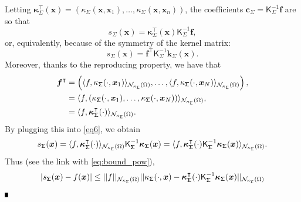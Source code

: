 \documentclass[hyphens,a4paper,11pt]{article}
\newcommand{\bs}{\boldsymbol}
\def\blackbox{\leavevmode\vrule height 5pt width 4pt depth 0pt\relax}
\newenvironment{proof}{\begin{trivlist}
\item[]\hspace{0cm}{\bf Proof:}
\hspace{0cm} }{\hfill $\blackbox$
\end{trivlist}}
\newcommand{\mK}{\mathsf{K}}
\newcommand{\mSigma}{\mathsf{\Sigma}}
\begin{document}
\begin{proof}
    Letting $\boldsymbol{\kappa}_{\mSigma}^{\intercal}({\boldsymbol{x}} ) = \left(\kappa_{\mSigma}(\boldsymbol{x},\boldsymbol{x}_1), \ldots,\kappa_{\mSigma} (\boldsymbol{x},\boldsymbol{x}_n) \right)$, the coefficients $\boldsymbol{{c}}_{\mSigma}={\mK}_{\mSigma}^{-1} \boldsymbol{f}$ are so that
 \begin{equation*}
 s_{\mSigma}(\bs{x}) = \boldsymbol{\kappa}_{\mSigma}^{\intercal}(\boldsymbol{x}) {\mK}_{\mSigma}^{-1}  \boldsymbol{f},
 \end{equation*}
 or, equivalently, because of the symmetry of the kernel matrix:
 \begin{equation}
 s_{\mSigma}(\bs{x}) = \boldsymbol{f}^{\intercal} {\mK}_{{\mSigma}}^{-1} \boldsymbol{k}_{\mSigma}(\boldsymbol{x}).
 \label{eq6}
 \end{equation}
 Moreover, thanks to the reproducing property, we have that 
 \begin{align*}
 \boldsymbol{f}^{\intercal} & = \left( \langle f,\kappa_{\mSigma}(\cdot,\boldsymbol{x}_1)\rangle_{{\cal N}_{\kappa_{\mSigma}} (\Omega)}, \ldots, \langle f,\kappa_{\mSigma}(\cdot,\boldsymbol{x}_N)\rangle_{{\cal N}_{\kappa_{\mSigma}} (\Omega)} \right),\\
 & = \langle f,(\kappa_{\mSigma}(\cdot,\boldsymbol{x}_1), \ldots, \kappa_{\mSigma}(\cdot,\boldsymbol{x}_N))\rangle_{{\cal N}_{\kappa_{\mSigma}} (\Omega)},\\
 & = \langle f, \boldsymbol{\kappa}_{\mSigma}^{\intercal}(\cdot)\rangle_{{\cal N}_{\kappa_{\mSigma}} (\Omega)}.
 \end{align*}
 By plugging this into \eqref{eq6}, we obtain
 \begin{equation*}
 s_{\mSigma}(\bs{x}) = \langle f, \boldsymbol{\kappa}_{\mSigma}^{\intercal}(\cdot)\rangle_{{\cal N}_{\kappa_{\mSigma}} (\Omega)} \mK_{\mSigma}^{-1} \boldsymbol{\kappa}_{\mSigma}(\boldsymbol{x}) = \langle f, \boldsymbol{\kappa}_{\mSigma}^{\intercal}(\cdot)\mK_{{\mSigma}}^{-1} \boldsymbol{\kappa}_{\mSigma}(\boldsymbol{x})\rangle_{{\cal N}_{\kappa_{\mSigma}} (\Omega)}.
 \label{eq7}
 \end{equation*}
Thus (see the link with \eqref{eq:bound_pow}), 
\begin{align*}
|s_{\mSigma}(\bs{x})-f(\bs{x})| & \leq ||f||_{{\cal N}_{\kappa_{\mSigma}} (\Omega)} || \kappa_{{\mSigma}}(\cdot,\boldsymbol{x})-\boldsymbol{\kappa}_{{\mSigma}}^{\intercal}(\cdot) \mK_{{\mSigma}}^{-1} \boldsymbol{\kappa}_{{\mSigma}}(\boldsymbol{x}) ||_{{\cal N}_{\kappa_{\mSigma}} (\Omega)} \nonumber \\

\end{align*}
\end{proof}
\end{document}
